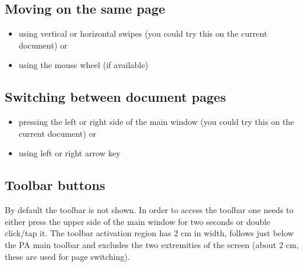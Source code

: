 \documentclass[journal,12pt]{IEEEtran}
\begin{document}
\subsection{Moving on the same page}
\begin{itemize}
 \item using vertical or horizontal swipes (you could try this on the current document) or
 \item using the mouse wheel (if available)
\end{itemize}

\subsection{Switching between document pages}
\begin{itemize}
 \item pressing the left or right side of the main window (you could try this on the current document) or
 \item using left or right arrow key
\end{itemize}

\subsection{Toolbar buttons}

By default the toolbar is not shown. In order to access the toolbar one needs 
to either press the upper side of the main window for two seconds or double 
click/tap it. The toolbar activation region has 2 cm in width, follows just 
below the PA main toolbar and excludes the two extremities of the screen (about 
2 cm, these are used for page switching).
\end{document}
